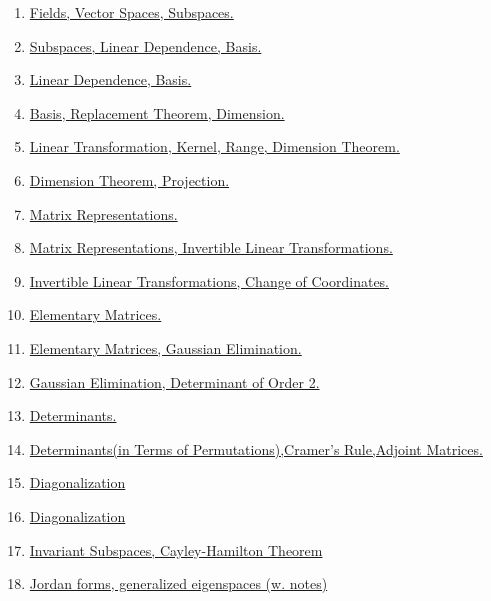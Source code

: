 \documentclass[11pt]{article}
\begin{document}
\begin{enumerate}
	\item	\href{https://mp.weixin.qq.com/s/ttSUU5e1VIw0RlR9yEFz-w}{Fields, Vector Spaces, Subspaces.}	%
	\item	\href{https://mp.weixin.qq.com/s/DG82287b3nzbWEYK03wvXg}{Subspaces, Linear Dependence, Basis.}	%
	\item	\href{https://mp.weixin.qq.com/s/KtGLyfuco0ZRvB7V7MQgIg}{Linear Dependence, Basis.} 	%
	\item 	\href{https://mp.weixin.qq.com/s/vDaiM2eqmImP-yuyLkAAfA}{Basis, Replacement Theorem, Dimension.}	%
	\item 	\href{https://mp.weixin.qq.com/s/qPUpcKaqbajqOnhxYj8NWQ}{Linear Transformation, Kernel, Range, Dimension Theorem.}	%
	\item 	\href{https://mp.weixin.qq.com/s/ZsJsnxGjPqk3so-tg_VoCQ}{Dimension Theorem, Projection.}	%
	\item 	\href{https://mp.weixin.qq.com/s/iRLywsoOIPqLhNQ_4WNLUQ}{Matrix Representations.}	%
	\item 	\href{https://mp.weixin.qq.com/s/yaCDnvV31RwCq176FaQzSg}{Matrix Representations, Invertible Linear Transformations.}	%
	\item 	\href{https://mp.weixin.qq.com/s/X_w8eGXGkvhszKBB6rttAA}{Invertible Linear Transformations, Change of Coordinates.}	%
	\item 	\href{https://mp.weixin.qq.com/s/KQGx-ONRzar6vcbcuzNDqA}{Elementary Matrices.}	%
	\item	\href{https://mp.weixin.qq.com/s/W1xGLgIGEdR1PAIO2pD37A}{Elementary Matrices, Gaussian Elimination.}	%
	\item	\href{https://mp.weixin.qq.com/s/1hTQU7r7uKbDBpD0We0Q0Q}{Gaussian Elimination, Determinant of Order 2.}	%
	\item	\href{https://mp.weixin.qq.com/s/7XIFrm6AsWjGaz6KGQz5Kg}{Determinants.} 	%
	\item 	\href{https://mp.weixin.qq.com/s/DpUogpbEYBJfyfzWzW0B1g}{Determinants(in Terms of Permutations),Cramer's Rule,Adjoint Matrices.}	%
	\item 	\href{https://mp.weixin.qq.com/s/UU53_uzX_2DTj5YnP99AQQ}{Diagonalization}	%
	\item 	\href{https://mp.weixin.qq.com/s/w8EKjK4Tkb0lP74txqxPIQ}{Diagonalization}	%
	\item 	\href{https://mp.weixin.qq.com/s/xA9QwoBdUQ21Zs2bCqXxeA}{Invariant Subspaces, Cayley-Hamilton Theorem}	%
	\item 	\href{https://mp.weixin.qq.com/s/GhF_4b4CG2tR1hKzXTMQEg}{Jordan forms, generalized eigenspaces (w. notes)}	%

\end{enumerate}
\end{document}
